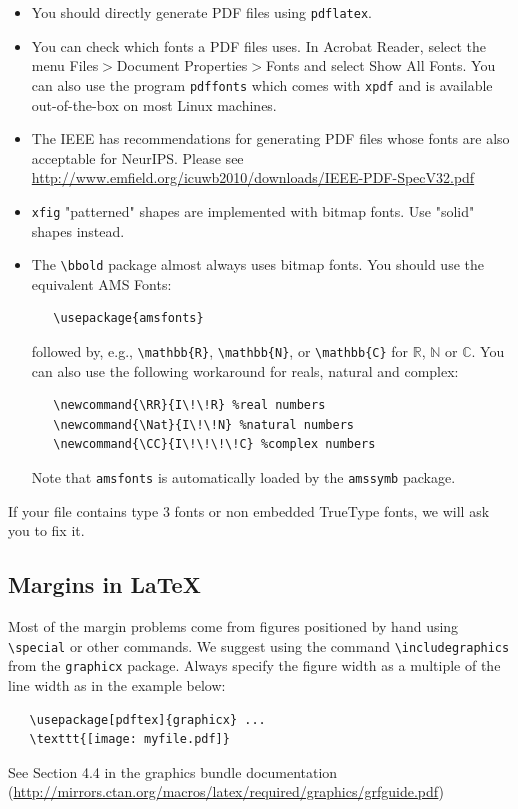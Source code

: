\documentclass{article}
\begin{document}
\begin{itemize}

\item You should directly generate PDF files using \verb+pdflatex+.

\item You can check which fonts a PDF files uses.  In Acrobat Reader, select the
  menu Files$>$Document Properties$>$Fonts and select Show All Fonts. You can
  also use the program \verb+pdffonts+ which comes with \verb+xpdf+ and is
  available out-of-the-box on most Linux machines.

\item The IEEE has recommendations for generating PDF files whose fonts are also
  acceptable for NeurIPS. Please see
  \url{http://www.emfield.org/icuwb2010/downloads/IEEE-PDF-SpecV32.pdf}

\item \verb+xfig+ "patterned" shapes are implemented with bitmap fonts.  Use
  "solid" shapes instead.

\item The \verb+\bbold+ package almost always uses bitmap fonts.  You should use
  the equivalent AMS Fonts:
\begin{verbatim}
   \usepackage{amsfonts}
\end{verbatim}
followed by, e.g., \verb+\mathbb{R}+, \verb+\mathbb{N}+, or \verb+\mathbb{C}+
for $\mathbb{R}$, $\mathbb{N}$ or $\mathbb{C}$.  You can also use the following
workaround for reals, natural and complex:
\begin{verbatim}
   \newcommand{\RR}{I\!\!R} %real numbers
   \newcommand{\Nat}{I\!\!N} %natural numbers
   \newcommand{\CC}{I\!\!\!\!C} %complex numbers
\end{verbatim}
Note that \verb+amsfonts+ is automatically loaded by the \verb+amssymb+ package.

\end{itemize}

If your file contains type 3 fonts or non embedded TrueType fonts, we will ask
you to fix it.

\subsection{Margins in \LaTeX{}}

Most of the margin problems come from figures positioned by hand using
\verb+\special+ or other commands. We suggest using the command
\verb+\includegraphics+ from the \verb+graphicx+ package. Always specify the
figure width as a multiple of the line width as in the example below:
\begin{verbatim}
   \usepackage[pdftex]{graphicx} ...
   \texttt{[image: myfile.pdf]}
\end{verbatim}
See Section 4.4 in the graphics bundle documentation
(\url{http://mirrors.ctan.org/macros/latex/required/graphics/grfguide.pdf})
\end{document}
